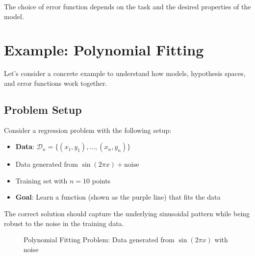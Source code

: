 \documentclass[11pt,a4paper]{article}
\theoremstyle{definition}
\theoremstyle{plain}
\theoremstyle{remark}
\begin{document}
The choice of error function depends on the task and the desired properties of the model.

\section{Example: Polynomial Fitting}

Let's consider a concrete example to understand how models, hypothesis spaces, and error functions work together.

\subsection{Problem Setup}

Consider a regression problem with the following setup:
\begin{itemize}
    \item \textbf{Data}: $\mathcal{D}_n = \{(x_1, y_1), \ldots, (x_n, y_n)\}$
    \item Data generated from $\sin(2\pi x) + \text{noise}$
    \item Training set with $n = 10$ points
    \item \textbf{Goal}: Learn a function (shown as the purple line) that fits the data
\end{itemize}

The correct solution should capture the underlying sinusoidal pattern while being robust to the noise in the training data.

\begin{figure}[h]
\centering
{}
\caption{Polynomial Fitting Problem: Data generated from $\sin(2\pi x)$ with noise}
\end{figure}
\end{document}
